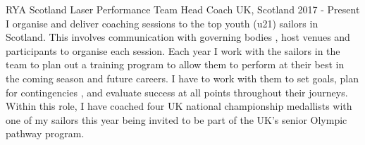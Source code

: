   \cventry
    {RYA Scotland} %
    {Laser Performance Team Head Coach} %
    {UK, Scotland} %
    {2017 - Present} %
    {
        I organise and deliver coaching sessions to the top youth (u21) 
        sailors in Scotland. This involves communication with governing bodies
        , host venues and participants to organise each session. Each year I 
        work with the sailors in the team to plan out a training program to 
        allow them to perform at their best in the coming season and future 
        careers. I have to work with them to set goals, plan for contingencies
        , and evaluate success at all points throughout their journeys.\newline
        Within this role, I have coached four UK national championship 
        medallists with one of my sailors this year being invited to be part 
        of the UK's senior Olympic pathway program.\newline
     }

